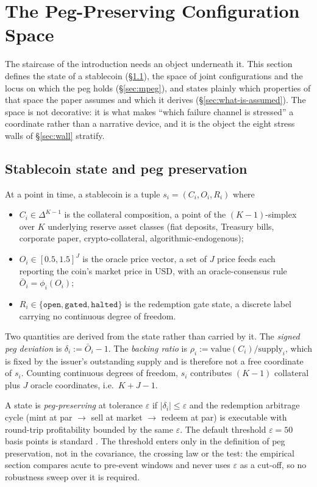 
\section{The Peg-Preserving Configuration Space}\label{sec:moduli}
The staircase of the introduction needs an object underneath it. This section defines the state of a stablecoin (\S\ref{sec:tuple}), the space of joint configurations and the locus on which the peg holds (\S\ref{sec:mpeg}), and states plainly which properties of that space the paper assumes and which it derives (\S\ref{sec:what-is-assumed}). The space is not decorative: it is what makes ``which failure channel is stressed'' a coordinate rather than a narrative device, and it is the object the eight stress walls of \S\ref{sec:wall} stratify.

\subsection{Stablecoin state and peg preservation}\label{sec:tuple}
\begin{definition}\label{def:stable}
At a point in time, a stablecoin is a tuple $s_i = (C_i, O_i, R_i)$ where
\begin{itemize}
\item $C_i \in \Delta^{K-1}$ is the collateral composition, a point of the $(K-1)$-simplex over $K$ underlying reserve asset classes (fiat deposits, Treasury bills, corporate paper, crypto-collateral, algorithmic-endogenous);
\item $O_i \in [0.5, 1.5]^J$ is the oracle price vector, a set of $J$ price feeds each reporting the coin's market price in USD, with an oracle-consensus rule $\bar{O}_i = \phi_i(O_i)$;
\item $R_i \in \{\texttt{open}, \texttt{gated}, \texttt{halted}\}$ is the redemption gate state, a discrete label carrying no continuous degree of freedom.
\end{itemize}
Two quantities are derived from the state rather than carried by it. The \emph{signed peg deviation} is $\delta_i := \bar{O}_i - 1$. The \emph{backing ratio} is $\rho_i := \mathrm{value}(C_i)/\mathrm{supply}_i$, which is fixed by the issuer's outstanding supply and is therefore not a free coordinate of $s_i$. Counting continuous degrees of freedom, $s_i$ contributes $(K-1)$ collateral plus $J$ oracle coordinates, i.e.\ $K + J - 1$.

A state is \emph{peg-preserving} at tolerance $\varepsilon$ if $|\delta_i| \le \varepsilon$ and the redemption arbitrage cycle (mint at par $\to$ sell at market $\to$ redeem at par) is executable with round-trip profitability bounded by the same $\varepsilon$. The default threshold $\varepsilon = 50$ basis points is standard \citep{LyonsViswanath2023}. The threshold enters only in the definition of peg preservation, not in the covariance, the crossing law or the test: the empirical section compares acute to pre-event windows and never uses $\varepsilon$ as a cut-off, so no robustness sweep over it is required.
\end{definition}

